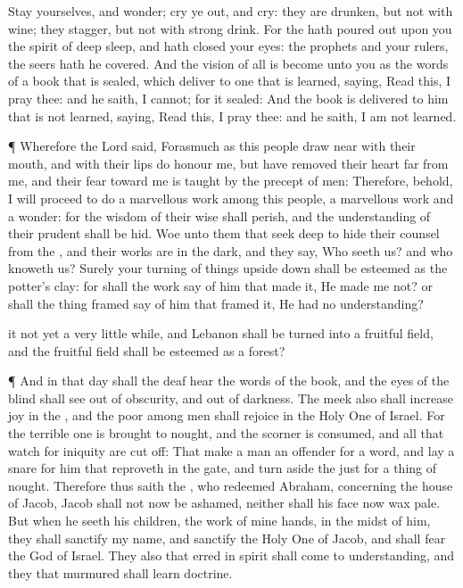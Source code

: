 {Stay yourselves, and
wonder; cry ye
out, and
cry: they are
drunken, but not with
wine; they
stagger, but not with strong
drink.
For the
{} hath poured
out upon you the
spirit of deep
sleep, and hath
closed your
eyes: the
prophets and your
rulers, the
seers hath he
covered.
And the
vision of all is become unto you as the
words of a
book that is
sealed, which
{}
deliver to one that is
learned,
saying,
Read this, I pray thee: and he
saith, I
cannot; for it
{}
sealed:
And the
book is
delivered to him that is not
learned,
saying,
Read this, I pray thee: and he
saith, I am not
learned.
\par }{\PP {}¶ Wherefore the
Lord
said,
Forasmuch as this
people draw
near
{} with their
mouth, and with their
lips do
honour me, but have
removed their
heart
far from me, and their
fear toward me is
taught by the
precept of
men:
Therefore, behold, I will
proceed to do a marvellous
work among this
people,
{} a marvellous
work and a
wonder: for the
wisdom of their
wise
{} shall
perish, and the
understanding of their
prudent
{} shall be
hid.
Woe unto them that seek
deep to
hide their
counsel from the
{}, and their
works are in the
dark, and they
say, Who
seeth us? and who
knoweth us?
Surely your turning of things upside
down shall be
esteemed as the
potter’s
clay: for shall the
work
say of him that
made it, He
made me not? or shall the thing
framed
say of him that
framed it, He had no
understanding?
\par }{\PP {} it not yet a
very little
while, and
Lebanon shall be
turned into a fruitful
field, and the fruitful
field shall be
esteemed as a
forest?
\par }{\PP {}¶ And in that
day shall the
deaf
hear the
words of the
book, and the
eyes of the
blind shall
see out of
obscurity, and out of
darkness.
The
meek also shall
increase
{}
joy in the
{}, and the
poor among
men shall
rejoice in the Holy
One of
Israel.
For the terrible
one is brought to
nought, and the
scorner is
consumed, and all that
watch for
iniquity are cut
off:
That make a
man an
offender for a
word, and lay a
snare for him that
reproveth in the
gate, and turn
aside the
just for a thing of
nought.
Therefore thus
saith the
{}, who
redeemed
Abraham, concerning the
house of
Jacob,
Jacob shall not now be
ashamed, neither shall his
face now wax
pale.
But when he
seeth his
children, the
work of mine
hands, in the
midst of him, they shall
sanctify my
name, and
sanctify the Holy
One of
Jacob, and shall
fear the
God of
Israel.
They also that
erred in
spirit shall
come to
understanding, and they that
murmured shall
learn
doctrine.

}
